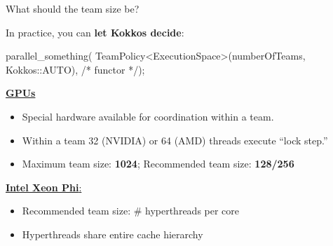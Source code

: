 \begin{frame}[fragile]{What should the team size be?}

  In practice, you can \textbf{let Kokkos decide}:

    \begin{code}[linebackgroundcolor={
      },
      keywords={}
    ]
parallel_something(
  TeamPolicy<ExecutionSpace>(numberOfTeams, Kokkos::AUTO),
  /* functor */);
    \end{code}

  \pause
  \vspace{0pt}

  \ul{\textbf{GPUs}}

  \begin{itemize}
    \item{Special hardware available for coordination within a team.}
    \item{Within a team 32 (NVIDIA) or 64 (AMD) threads execute ``lock step.''}
    \item{Maximum team size: \textbf{1024}; Recommended team size: \textbf{128/256}}
  \end{itemize}

  \pause
  \vspace{0pt}

  \ul{\textbf{Intel Xeon Phi}:}

  \begin{itemize}
    \item{Recommended team size: \# hyperthreads per core}
    \item{Hyperthreads share entire cache hierarchy} \\
      \hspace{2em}{a well-coordinated team avoids cache-thrashing}
  \end{itemize}

\end{frame}



